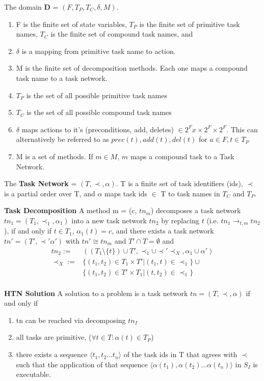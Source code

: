 The domain \textbf{D} = $(F, T_P, T_C, \delta, M)$.
\begin{enumerate}
	\item   F is the finite set of state variables, $T_P$ is the finite set of primitive task names, $T_C$ is the finite set of compound task names, and
   \item $\delta$ is a mapping from primitive task name to action.
   \item M is the finite set of decomposition methods. Each one maps a compound task name to a task network.
   \item $T_P$ is the set of all possible primitive task names
   \item $T_C$ is the set of all possible compound task names
   \item $\delta$ maps actions to it's (preconditions, add, deletes) $\in 2^F x\times 2^F \times 2^F$. This can alternatively be referred to as $prec(t), add(t), del(t)$ for $a \in F, t \in T_P$
   \item M is a set of methods. If $m \in M$, $m$ maps a compound task to a Task Network.
\end{enumerate}     

The \textbf{Task Network} = $(T, \prec, \alpha)$.
 T is a finite set of task identifiers (ids),
 $\prec$ is a partial order over T, and
 $\alpha$ maps task ids $\in$ T to task names in $T_C$ and $T_P$.
 
\textbf{Task Decomposition}
A method m = (c, $tn_m$) decomposes a task network $tn_1 = (T_1, \prec_1, \alpha_1)$ into
a new task network $tn_2$ by replacing $t$ (i.e. $tn_1 \rightarrow_{t,m} tn_2$), if and only if $t \in T_1$, $\alpha_1(t) = c$, and there exists a task network $tn' = (T', \prec' \alpha')$ with $tn' \cong tn_m$ and $T' \cap T = \emptyset$ and
\begin{align}
tn_2 :=     &((T_1 \setminus \{t\}) \cup T',    \prec_1 \cup \prec' \prec_X,        \alpha_1 \cup \alpha') \\
\prec_X :=  &\{(t_1, t_2) \in T_1 \times T'  \vert  (t_1,t) \in \prec_1 \} \cup \\
            &\{(t_1, t_2) \in T' \times T_1 \vert (t, t_2) \in \prec_1 \}  \\
\end{align}

 
\textbf{HTN Solution}
A solution to a problem is a task network $tn = (T, \prec, \alpha)$ if and only if
\begin{enumerate}
	\item tn can be reached via decomposing $tn_I$
    \item all tasks are primitive, ($\forall t \in T: \alpha(t) \in T_P$)
    \item there exists a sequence $\langle t_1, t_2 ... t_n \rangle$ of the task ids in T
    that agrees with $\prec$ such that the application of that sequence $\langle \alpha(t_1), \alpha(t_2) ... \alpha(t_n) \rangle$ in $S_I$ is executable.
\end{enumerate}     
     
